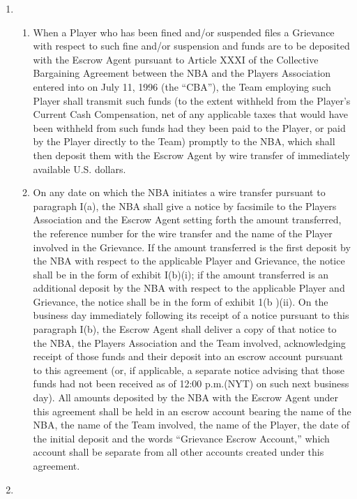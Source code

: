 \documentclass[
]{book}
\providecommand{\tightlist}{%
  \setlength{\itemsep}{0pt}\setlength{\parskip}{0pt}}
\begin{document}
\begin{enumerate}
\def\labelenumi{\arabic{enumi}.}
\item
  \begin{enumerate}
  \def\labelenumii{(\alph{enumii})}
  \tightlist
  \item
    When a Player who has been fined and/or suspended files a Grievance with respect to such fine and/or suspension and funds are to be deposited with the Escrow Agent pursuant to Article XXXI of the Collective Bargaining Agreement between the NBA and the Players Association entered into on July 11, 1996 (the ``CBA''), the Team employing such Player shall transmit such funds (to the extent withheld from the Player's Current Cash Compensation, net of any applicable taxes that would have been withheld from such funds had they been paid to the Player, or paid by the Player directly to the Team) promptly to the NBA, which shall then deposit them with the Escrow Agent by wire transfer of immediately available U.S. dollars.
  \item
    On any date on which the NBA initiates a wire transfer pursuant to paragraph I(a), the NBA shall give a notice by facsimile to the Players Association and the Escrow Agent setting forth the amount transferred, the reference number for the wire transfer and the name of the Player involved in the Grievance. If the amount transferred is the first deposit by the NBA with respect to the applicable Player and Grievance, the notice shall be in the form of exhibit I(b)(i); if the amount transferred is an additional deposit by the NBA with respect to the applicable Player and Grievance, the notice shall be in the form of exhibit 1(b )(ii). On the business day immediately following its receipt of a notice pursuant to this paragraph I(b), the Escrow Agent shall deliver a copy of that notice to the NBA, the Players Association and the Team involved, acknowledging receipt of those funds and their deposit into an escrow account pursuant to this agreement (or, if applicable, a separate notice advising that those funds had not been received as of 12:00 p.m.(NYT) on such next business day). All amounts deposited by the NBA with the Escrow Agent under this agreement shall be held in an escrow account bearing the name of the NBA, the name of the Team involved, the name of the Player, the date of the initial deposit and the words ``Grievance Escrow Account,'' which account shall be separate from all other accounts created under this agreement.
  \end{enumerate}
\item

\end{enumerate}
\end{document}
